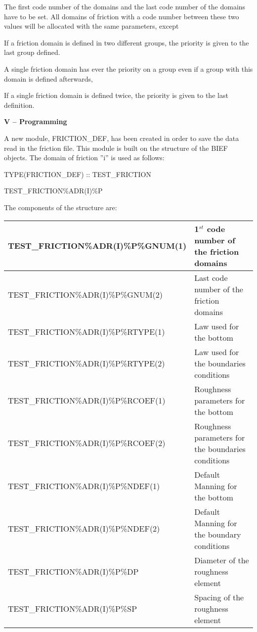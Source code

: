  The first code number of the domains and the last code number of the domains have to be set. All domains of friction with a code number between these two values will be allocated with the same parameters, except

 If a friction domain is defined in two different groups, the priority is given to the last group defined.

 A single friction domain has ever the priority on a group even if a group with this domain is defined afterwards,

 If a single friction domain is defined twice, the priority is given to the last definition.

 \textbf{ V -- Programming}

 A new module, FRICTION\_DEF, has been created in order to save the data read in the friction file. This module is built on the structure of the BIEF objects. The domain of friction ''i'' is used as follows:

 TYPE(FRICTION\_DEF) :: TEST\_FRICTION

 TEST\_FRICTION\%ADR(I)\%P

 The components of the structure are:



\begin{tabular}{|p{2.2in}|p{2.5in}|} \hline
TEST\_FRICTION\%ADR(I)\%P\%GNUM(1) & 1${}^{st}$ code number of the friction domains \\ \hline
TEST\_FRICTION\%ADR(I)\%P\%GNUM(2) & Last code number of the friction domains \\ \hline
TEST\_FRICTION\%ADR(I)\%P\%RTYPE(1) & Law used for the bottom \\ \hline
TEST\_FRICTION\%ADR(I)\%P\%RTYPE(2) & Law used for the boundaries conditions \\ \hline
TEST\_FRICTION\%ADR(I)\%P\%RCOEF(1) & Roughness parameters for the bottom \\ \hline
TEST\_FRICTION\%ADR(I)\%P\%RCOEF(2) & Roughness parameters for the boundaries conditions \\ \hline
TEST\_FRICTION\%ADR(I)\%P\%NDEF(1) & Default Manning for the bottom \\ \hline
TEST\_FRICTION\%ADR(I)\%P\%NDEF(2) & Default Manning for the boundary conditions \\ \hline
TEST\_FRICTION\%ADR(I)\%P\%DP & Diameter of the roughness element \\ \hline
TEST\_FRICTION\%ADR(I)\%P\%SP & Spacing of the roughness element \\ \hline
\end{tabular}



